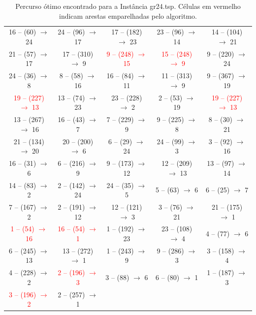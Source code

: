 \begin{table}[H]
\begin{tabular}{|c|c|c|c|c|}
    16 -- (60) $\rightarrow$ 24 & 24 -- (96) $\rightarrow$ 17 & 17 -- (182) $\rightarrow$ 23 & 23 -- (96) $\rightarrow$ 14 & 14 -- (104) $\rightarrow$ 21 \\
    21 -- (57) $\rightarrow$ 17 & 17 -- (310) $\rightarrow$ 9 & \textcolor{red}{9 -- (248) $\rightarrow$ 15} & \textcolor{red}{15 -- (248) $\rightarrow$ 9} & 9 -- (220) $\rightarrow$ 24 \\
    24 -- (36) $\rightarrow$ 8 & 8 -- (58) $\rightarrow$ 16 & 16 -- (84) $\rightarrow$ 11 & 11 -- (313) $\rightarrow$ 9 & 9 -- (367) $\rightarrow$ 19 \\
    \textcolor{red}{19 -- (227) $\rightarrow$ 13} & 13 -- (74) $\rightarrow$ 23 & 23 -- (228) $\rightarrow$ 2 & 2 -- (53) $\rightarrow$ 19 & \textcolor{red}{19 -- (227) $\rightarrow$ 13} \\
    13 -- (267) $\rightarrow$ 16 & 16 -- (43) $\rightarrow$ 7 & 7 -- (229) $\rightarrow$ 9 & 9 -- (225) $\rightarrow$ 8 & 8 -- (30) $\rightarrow$ 21 \\
    21 -- (134) $\rightarrow$ 20 & 20 -- (200) $\rightarrow$ 6 & 6 -- (29) $\rightarrow$ 24 & 24 -- (99) $\rightarrow$ 3 & 3 -- (92) $\rightarrow$ 16 \\
    16 -- (31) $\rightarrow$ 6 & 6 -- (216) $\rightarrow$ 9 & 9 -- (173) $\rightarrow$ 12 & 12 -- (209) $\rightarrow$ 13 & 13 -- (97) $\rightarrow$ 14 \\
    14 -- (83) $\rightarrow$ 2 & 2 -- (142) $\rightarrow$ 24 & 24 -- (35) $\rightarrow$ 5 & 5 -- (63) $\rightarrow$ 6 & 6 -- (25) $\rightarrow$ 7 \\
    7 -- (167) $\rightarrow$ 2 & 2 -- (191) $\rightarrow$ 12 & 12 -- (121) $\rightarrow$ 3 & 3 -- (76) $\rightarrow$ 21 & 21 -- (175) $\rightarrow$ 1 \\
    \textcolor{red}{1 -- (54) $\rightarrow$ 16} & \textcolor{red}{16 -- (54) $\rightarrow$ 1} & 1 -- (192) $\rightarrow$ 23 & 23 -- (108) $\rightarrow$ 4 & 4 -- (77) $\rightarrow$ 6 \\
    6 -- (245) $\rightarrow$ 13 & 13 -- (272) $\rightarrow$ 1 & 1 -- (243) $\rightarrow$ 9 & 9 -- (286) $\rightarrow$ 3 & 3 -- (158) $\rightarrow$ 4 \\
    4 -- (228) $\rightarrow$ 2 & \textcolor{red}{2 -- (196) $\rightarrow$ 3} & 3 -- (88) $\rightarrow$ 6 & 6 -- (80) $\rightarrow$ 1 & 1 -- (187) $\rightarrow$ 3 \\
    \textcolor{red}{3 -- (196) $\rightarrow$ 2} & 2 -- (257) $\rightarrow$ 1 &   &   &   \\
        \hline
    \end{tabular}
    \caption{Percurso ótimo encontrado para a Instância gr24.tsp. Células em vermelho indicam arestas emparelhadas pelo algoritmo.}
    \label{tab:percurso_gr24}
\end{table}
